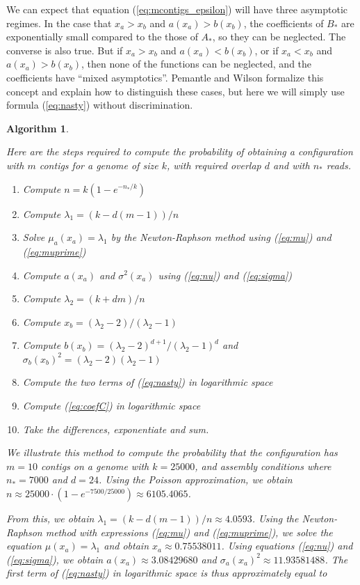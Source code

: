 \documentclass{article}
\newtheorem{algorithm}{Algorithm}
\begin{document}
We can expect that equation (\ref{eq:mcontigs_epsilon}) will have three
asymptotic regimes. In the case that $x_a > x_b$ and $a(x_a) > b(x_b)$,
the coefficients of $B_*$ are exponentially small compared to the those of
$A_*$, so they can be neglected. The converse is also true. But if $x_a >
x_b$ and $a(x_a) < b(x_b)$, or if $x_a < x_b$ and $a(x_a) > b(x_b)$, then
none of the functions can be neglected, and the coefficients have ``mixed
asymptotics''. Pemantle and Wilson \cite{AnalComb2013} formalize this
concept and explain how to distinguish these cases, but here we will
simply use formula (\ref{eq:nasty}) without discrimination.


\begin{algorithm}
\label{alg:nasty}

Here are the steps required to compute the probability of obtaining a
configuration with $m$ contigs for a genome of size $k$, with required
overlap $d$ and with $n_*$ reads.

\begin{enumerate}
\item Compute $n = k(1-e^{-n_*/k})$
\item Compute $\lambda_1 = (k-d(m-1))/n$
\item Solve $\mu_a(x_a) = \lambda_1$ by the Newton-Raphson method using
(\ref{eq:mu}) and (\ref{eq:muprime})
\item Compute $a(x_a)$ and $\sigma^2(x_a)$ using
(\ref{eq:nu}) and (\ref{eq:sigma})
\item Compute $\lambda_2 = (k+dm)/n$
\item Compute $x_b = (\lambda_2-2)/(\lambda_2-1)$
\item Compute $b(x_b) = (\lambda_2-2)^{d+1} / (\lambda_2-1)^d$
and $\sigma_b(x_b)^2 = (\lambda_2-2)(\lambda_2-1)$
\item Compute the two terms of (\ref{eq:nasty}) in logarithmic space
\item Compute (\ref{eq:coefC}) in logarithmic space
\item Take the differences, exponentiate and sum.
\end{enumerate}

We illustrate this method to compute the probability that the
configuration has $m=10$ contigs on a genome with $k = 25000$, and
assembly conditions where $n_* = 7000$ and $d=24$. Using the Poisson
approximation, we obtain $n \approx 25000 \cdot (1-e^{-7500/25000})
\approx 6105.4065$.

From this, we obtain $\lambda_1 = (k-d(m-1))/n \approx 4.0593$. Using the
Newton-Raphson method with expressions (\ref{eq:mu}) and
(\ref{eq:muprime}), we solve the equation $\mu(x_a) = \lambda_1$ and
obtain $x_a \approx 0.75538011$. Using equations (\ref{eq:nu}) and
(\ref{eq:sigma}), we obtain $a(x_a) \approx 3.08429680$ and
$\sigma_a(x_a)^2 \approx 11.93581488$. The first term of
(\ref{eq:nasty}) in logarithmic space is thus approximately equal to


\end{algorithm}
\end{document}
